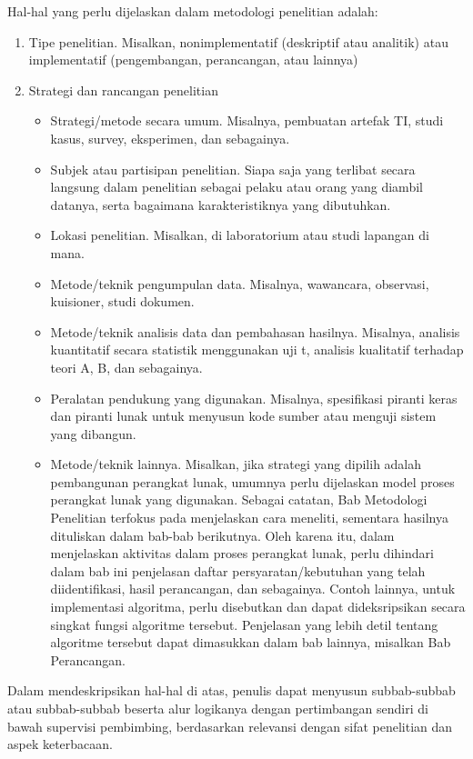 Hal-hal yang perlu dijelaskan dalam metodologi penelitian adalah: 
\begin{enumerate}
  \item Tipe penelitian. Misalkan, nonimplementatif (deskriptif atau analitik) atau implementatif (pengembangan, perancangan, atau lainnya)
  \item Strategi dan rancangan penelitian 
  \begin{itemize}
    \item Strategi/metode secara umum. Misalnya, pembuatan artefak TI, studi kasus, survey, eksperimen, dan sebagainya. 
    \item Subjek atau partisipan penelitian. Siapa saja yang terlibat secara langsung dalam penelitian sebagai pelaku atau orang yang diambil datanya, serta bagaimana karakteristiknya yang dibutuhkan.
    \item Lokasi penelitian. Misalkan, di laboratorium atau studi lapangan di mana.
    \item Metode/teknik pengumpulan data. Misalnya, wawancara, observasi, kuisioner, studi dokumen.
    \item Metode/teknik analisis data dan pembahasan hasilnya. Misalnya, analisis kuantitatif secara statistik menggunakan uji t, analisis kualitatif terhadap teori A, B, dan sebagainya.
    \item Peralatan pendukung yang digunakan. Misalnya, spesifikasi piranti keras dan piranti lunak untuk menyusun kode sumber atau menguji sistem yang dibangun.
    \item Metode/teknik lainnya. Misalkan, jika strategi yang dipilih adalah pembangunan perangkat lunak, umumnya perlu dijelaskan model proses perangkat lunak yang digunakan. Sebagai catatan, Bab Metodologi Penelitian terfokus pada menjelaskan cara meneliti, sementara hasilnya dituliskan dalam bab-bab berikutnya. Oleh karena itu, dalam menjelaskan aktivitas dalam proses perangkat lunak, perlu dihindari dalam bab ini penjelasan daftar persyaratan/kebutuhan yang telah diidentifikasi, hasil perancangan, dan sebagainya. Contoh lainnya, untuk implementasi algoritma, perlu disebutkan dan dapat dideksripsikan secara singkat fungsi algoritme tersebut. Penjelasan yang lebih detil tentang algoritme tersebut dapat dimasukkan dalam bab lainnya, misalkan Bab Perancangan. 
  \end{itemize}
\end{enumerate}

Dalam mendeskripsikan hal-hal di atas, penulis dapat menyusun subbab-subbab atau subbab-subbab beserta alur logikanya dengan pertimbangan sendiri di bawah supervisi pembimbing, berdasarkan relevansi dengan sifat penelitian dan aspek keterbacaan.

